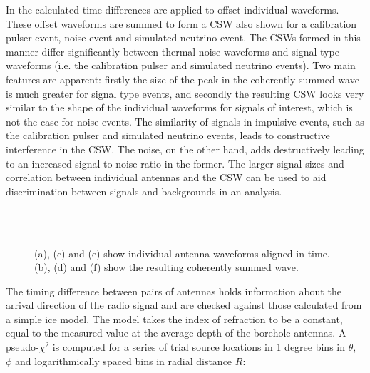 In  the calculated time differences are applied to offset individual waveforms. These offset waveforms are summed to form a CSW also shown for a calibration pulser event, noise event and simulated neutrino event. The CSWs formed in this manner differ significantly between thermal noise waveforms and signal type waveforms (i.e. the calibration pulser and simulated neutrino events). Two main features are apparent: firstly the size of the peak in the coherently summed wave is much greater for signal type events, and secondly the resulting CSW looks very similar to the shape of the individual waveforms for signals of interest, which is not the case for noise events. The similarity of signals in impulsive events, such as the calibration pulser and simulated neutrino events, leads to constructive interference in the CSW. The noise, on the other hand, adds destructively leading to an increased  signal to noise ratio in the former. The larger signal sizes and correlation between individual antennas and the CSW can be used to aid discrimination between signals and backgrounds in an analysis.


\begin{figure}[htpb]
  \hfill
  \\
  \hfill
  \\
  \hfill
  \caption{(a), (c) and (e) show individual antenna waveforms aligned in time. (b), (d) and (f) show the resulting coherently summed wave.} 
  \label{fig:analysis:Reconstruction:CSW-Example}
\end{figure}


The timing difference between pairs of antennas holds information about the arrival direction of the radio signal and are checked against those calculated from a simple ice model. The model takes the index of refraction to be a constant, equal to the measured value at the average depth of the borehole antennas. A pseudo-$\chi^{2}$ is computed for a series of trial source locations in 1 degree bins in $\theta$, $\phi$ and logarithmically spaced bins in radial distance $R$:


